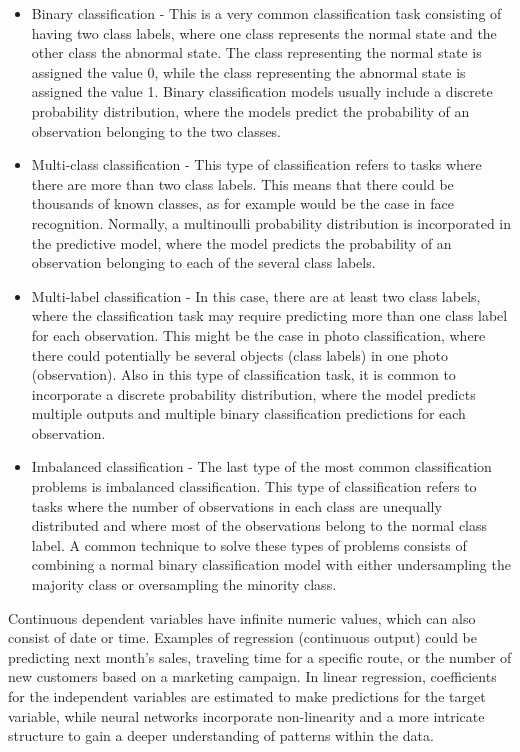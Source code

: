 \begin{itemize}
\item {Binary classification} - This is a very common classification task consisting of having two class labels, where one class represents the normal state and the other class the abnormal state. The class representing the normal state is assigned the value 0, while the class representing the abnormal state is assigned the value 1. Binary classification models usually include a discrete probability distribution, where the models predict the probability of an observation belonging to the two classes.
\item {Multi-class classification} - This type of classification refers to tasks where there are more than two class labels. This means that there could be thousands of known classes, as for example would be the case in face recognition. Normally, a multinoulli probability distribution is incorporated in the predictive model, where the model predicts the probability of an observation belonging to each of the several class labels.
\item {Multi-label classification} - In this case, there are at least two class labels, where the classification task may require predicting more than one class label for each observation. This might be the case in photo classification, where there could potentially be several objects (class labels) in one photo (observation). Also in this type of classification task, it is common to incorporate a discrete probability distribution, where the model predicts multiple outputs and multiple binary classification predictions for each observation.
\item {Imbalanced classification} - The last type of the most common classification problems is imbalanced classification. This type of classification refers to tasks where the number of observations in each class are unequally distributed and where most of the observations belong to the normal class label. A common technique to solve these types of problems consists of combining a normal binary classification model with either undersampling the majority class or oversampling the minority class.
\end{itemize}
\cite{brownlee} 

\indent\newline
Continuous dependent variables have infinite numeric values, which can also consist of date or time. Examples of regression (continuous output) could be predicting next month's sales, traveling time for a specific route, or the number of new customers based on a marketing campaign. In linear regression, coefficients for the independent variables are estimated to make predictions for the target variable, while neural networks incorporate non-linearity and a more intricate structure to gain a deeper understanding of patterns within the data. 

